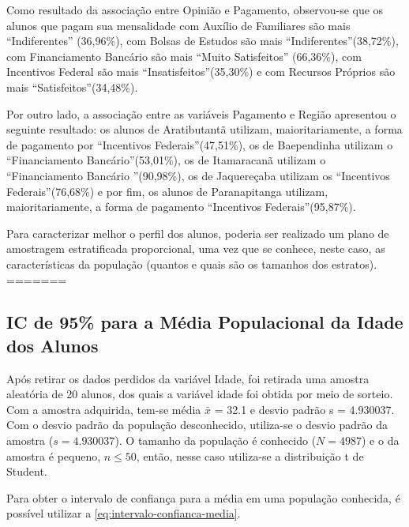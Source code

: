 Como resultado da associação entre Opinião e Pagamento, observou-se que os alunos que pagam sua mensalidade com Auxílio de Familiares são mais \textquotedblleft Indiferentes\textquotedblright 
(36,96\%), com Bolsas de Estudos são mais \textquotedblleft Indiferentes\textquotedblright (38,72\%), com Financiamento Bancário são mais \textquotedblleft Muito Satisfeitos\textquotedblright 
(66,36\%), com Incentivos Federal são mais \textquotedblleft Insatisfeitos\textquotedblright (35,30\%) e com Recursos Próprios são mais \textquotedblleft Satisfeitos\textquotedblright (34,48\%).

Por outro lado, a associação entre as variáveis Pagamento e Região apresentou o seguinte resultado: os alunos de Aratibutantã utilizam, maioritariamente, a forma de pagamento por 
\textquotedblleft Incentivos Federais\textquotedblright (47,51\%), os de Baependinha utilizam o \textquotedblleft Financiamento Bancário\textquotedblright (53,01\%), os de Itamaracanã utilizam o 
\textquotedblleft Financiamento Bancário \textquotedblright (90,98\%), os de Jaquereçaba utilizam os \textquotedblleft Incentivos Federais\textquotedblright (76,68\%) e por fim, os alunos de 
Paranapitanga utilizam, maioritariamente, a forma de pagamento \textquotedblleft Incentivos Federais\textquotedblright (95,87\%). 


Para caracterizar melhor o perfil dos alunos, poderia ser realizado um plano de amostragem estratificada proporcional, uma vez que se conhece, neste caso, as características da população (quantos e 
quais são os tamanhos dos estratos). 
=======
\subsection{IC de 95\% para a Média Populacional da Idade dos Alunos}
\label{sub:1a}
	
	Após retirar os dados perdidos da variável Idade, foi retirada uma
	amostra aleatória de 20 alunos, dos quais a variável idade foi obtida por meio de sorteio. Com a amostra
	adquirida, tem-se média $\bar{x}$ = \num{32,1} e desvio padrão s = \num{4,930037}.
	Com o desvio padrão da população desconhecido, utiliza-se o desvio
	padrão da amostra ($s = \num{4,930037}$).  O tamanho da população é conhecido ($N
	= 4987$) e o da amostra é pequeno, $n \leq 50$, então, nesse caso utiliza-se
	a distribuição t de Student.

	Para obter o intervalo de confiança para a média em uma população
	conhecida, é possível utilizar a \autoref{eq:intervalo-confianca-media}.

